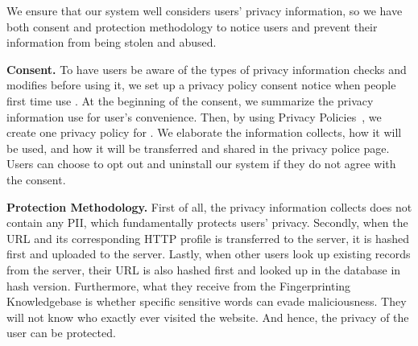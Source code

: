 We ensure that our \spartacus system well considers users' privacy information,
so we have both consent and protection methodology to notice users and prevent their information from being stolen and abused.

\noindent
\textbf{Consent.}
To have users be aware of the types of privacy information \spartacus checks and modifies before using it,
we set up a privacy policy consent notice when people first time use \spartacus.
At the beginning of the consent, we summarize the privacy information \spartacus use for user's convenience.
Then, by using Privacy Policies~\cite{privacypolicy}, we create one privacy policy for \spartacus.
We elaborate the information \spartacus collects, how it will be used, and how it will be transferred and shared in the privacy police page.
Users can choose to opt out and uninstall our system if they do not agree with the consent.

\noindent
\textbf{Protection Methodology.}
First of all, the privacy information \spartacus collects does not contain any PII, which fundamentally protects users' privacy.
Secondly, when the URL and its corresponding HTTP profile is transferred to the server,
it is hashed first and uploaded to the server.
Lastly, when other users look up existing records from the server,
their URL is also hashed first and looked up in the database in hash version.
Furthermore, what they receive from the Fingerprinting Knowledgebase is whether specific sensitive words can evade maliciousness.
They will not know who exactly ever visited the website.
And hence, the privacy of the user can be protected.